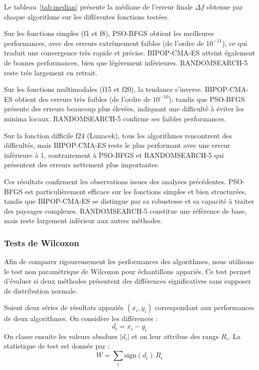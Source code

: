 \documentclass[conference]{IEEEtran}
\begin{document}
Le tableau~\ref{tab:median} pr\'esente la m\'ediane de l'erreur finale $\Delta f$ obtenue par chaque algorithme sur les diff\'erentes fonctions test\'ees.

Sur les fonctions simples (f1 et f8), PSO-BFGS obtient les meilleures performances, avec des erreurs extr\^emement faibles (de l'ordre de $10^{-11}$), ce qui traduit une convergence tr\`es rapide et pr\'ecise. BIPOP-CMA-ES atteint \'egalement de bonnes performances, bien que l\'eg\`erement inf\'erieures. RANDOMSEARCH-5 reste tr\`es largement en retrait.

Sur les fonctions multimodales (f15 et f20), la tendance s'inverse. BIPOP-CMA-ES obtient des erreurs tr\`es faibles (de l'ordre de $10^{-10}$), tandis que PSO-BFGS pr\'esente des erreurs beaucoup plus \'elev\'ees, indiquant une difficult\'e \`a \'eviter les minima locaux. RANDOMSEARCH-5 confirme ses faibles performances.

Sur la fonction difficile f24 (Lunacek), tous les algorithmes rencontrent des difficult\'es, mais BIPOP-CMA-ES reste le plus performant avec une erreur inf\'erieure \`a 1, contrairement \`a PSO-BFGS et RANDOMSEARCH-5 qui pr\'esentent des erreurs nettement plus importantes.

Ces r\'esultats confirment les observations issues des analyses pr\'ec\'edentes. PSO-BFGS est particuli\`erement efficace sur les fonctions simples et bien structur\'ees, tandis que BIPOP-CMA-ES se distingue par sa robustesse et sa capacit\'e \`a traiter des paysages complexes. RANDOMSEARCH-5 constitue une r\'ef\'erence de base, mais reste largement inf\'erieur aux autres m\'ethodes.

\subsubsection{Tests de Wilcoxon}

Afin de comparer rigoureusement les performances des algorithmes, nous utilisons le test non param\'etrique de Wilcoxon pour \'echantillons appari\'es. Ce test permet d'\'evaluer si deux m\'ethodes pr\'esentent des diff\'erences significatives sans supposer de distribution normale.

Soient deux s\'eries de r\'esultats appari\'es $(x_i, y_i)$ correspondant aux performances de deux algorithmes. On consid\`ere les diff\'erences :
\begin{equation}
d_i = x_i - y_i
\end{equation}
On classe ensuite les valeurs absolues $|d_i|$ et on leur attribue des rangs $R_i$. La statistique de test est donn\'ee par :
\begin{equation}
W = \sum_i \text{sign}(d_i) \, R_i
\end{equation}
\end{document}
